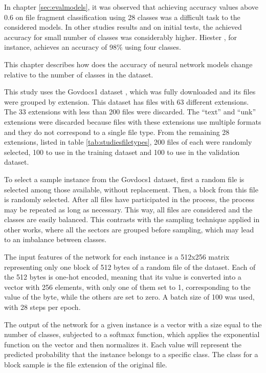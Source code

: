 In chapter \ref{sec:evalmodels}, it was observed that achieving accuracy values above 0.6 on file fragment classification using 28 classes was a difficult task to the considered models. In other studies results \cite{hiester_file_2018} \cite{sportiello_context-based_2012} \cite{amirani_feature-based_2013} \cite{maslim_distributed_2014} and on initial tests, the achieved accuracy for small number of classes was considerably higher. Hiester \cite{hiester_file_2018}, for instance, achieves an accuracy of 98\% using four classes.

This chapter describes how does the accuracy of neural network models change relative to the number of classes in the dataset.


This study uses the Govdocs1 dataset \cite{garfinkel_bringing_2009}, which was fully downloaded and its files were grouped by extension. This dataset has files with 63 different extensions. The 33 extensions with less than 200 files were discarded. The  ``text'' and ``unk'' extensions were discarded because files with these extensions use multiple formats and they do not correspond to a single file type. From the remaining 28 extensions, listed in table \ref{tab:studiesfiletypes}, 200 files of each were randomly selected, 100 to use in the training dataset and 100 to use in the validation dataset.

% 

To select a sample instance from the Govdocs1 dataset, first a random file is selected among those available, without replacement. Then, a block from this file is randomly selected. After all files have participated in the process, the process may be repeated as long as necessary. This way, all files are considered and the classes are easily balanced.
This contrasts with the sampling technique applied in other works, where all the sectors are grouped before sampling, which may lead to an imbalance between classes.

The input features of the network for each instance is a 512x256 matrix representing only one block of 512 bytes of a random file of the dataset. Each of the 512 bytes is one-hot encoded, meaning that its value is converted into a vector with 256 elements, with only one of them set to 1, corresponding to the value of the byte, while the others are set to zero. A batch size of 100 was used, with 28 steps per epoch.

The output of the network for a given instance is a vector with a size equal to the number of classes, subjected to a softmax function, which applies the exponential function on the vector and then normalizes it. Each value will represent the predicted probability that the instance belongs to a specific class. The class for a block sample is the file extension of the original file.

